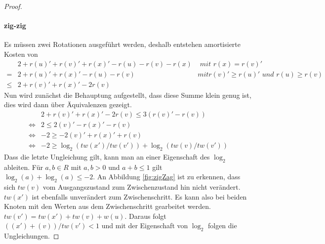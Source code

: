 \documentclass[a4paper,12pt]{article}
\begin{document}
\begin{proof}
\paragraph{zig-zig} 
Es müssen zwei Rotationen ausgeführt werden, deshalb entstehen amortisierte Kosten von
\begin{align*}
&2 + r\left(u\right)' +r\left(v\right)' +r\left(x\right)' - r\left(u\right)- r\left(v\right)- r\left(x\right) &\textit{ mit $r\left(x\right) =  r\left(v\right)'$ }\\
=& 2 + r\left(u\right)' +r\left(x\right)' - r\left(u\right)- r\left(v\right) &\textit{mit
$r\left(v\right)' \geq  r\left(u\right)'$ und $r\left(u\right) \geq  r\left(v\right)$}\\
\leq &  2 + r\left(v\right)' + r\left(x\right)' - 2 r\left(v\right) 
\end{align*}
Nun wird zunächst die Behauptung aufgestellt, dass diese Summe klein genug ist, dies wird dann über Äquivalenzen gezeigt.
\begin{align*}
& 2 + r\left(v\right)' + r\left(x\right)' - 2 r\left(v\right) \leq  3\left(r\left(v\right)'- r\left(v\right)\right)\\
 \Leftrightarrow &2 \leq 2\left(v\right)' -  r\left(x\right)' - r\left(v\right)\\
 \Leftrightarrow & -2 \geq -2\left(v\right)' +  r\left(x\right)' + r\left(v\right)\\
 \Leftrightarrow & -2 \geq \log_2\left(\mathit{tw}\left(x'\right) / \mathit{tw}\left(v'\right)\right) + \log_2\left(\mathit{tw}\left(v\right) / \mathit{tw}\left(v'\right)\right)
\end{align*}
Dass die letzte Ungleichung gilt, kann man an einer Eigenschaft des $\log_2$ ableiten. Für $a,b \in \mathit{R}$ mit $a,b > 0$ und $a + b \leq 1$ gilt $\log_2\left(a\right) + \log_2\left(a\right) \leq -2$. An Abbildung \ref{fig:zigZag} ist zu erkennen, dass sich $\mathit{tw}\left(v\right)$ vom Ausgangszustand zum Zwischenzustand hin nicht verändert. $\mathit{tw}\left(x'\right)$ ist ebenfalls unverändert zum Zwischenschritt. Es kann also bei beiden Knoten mit den Werten aus dem Zwischenschritt gearbeitet werden.  $\mathit{tw}\left(v'\right) = \mathit{tw}\left(x'\right) + \mathit{tw}\left(v\right) + w\left(u\right) $. Daraus folgt $\left(\left(x'\right) + \left(v\right)\right) /  \mathit{tw}\left(v'\right) < 1$ und mit der Eigenschaft von $\log_2$ folgen die Ungleichungen.
 

\end{proof}
\end{document}
